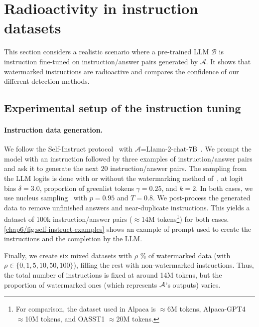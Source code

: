 \renewcommand{\aux}[1]{{\scriptsize \textcolor{gray}{$\pm$#1}}}

\section{Radioactivity in instruction datasets}
\label{chap6/sec:instruction}


This section considers a realistic scenario where a pre-trained LLM $\mathcal{B}$ is instruction fine-tuned on instruction/answer pairs generated by $\mathcal{A}$.
It shows that watermarked instructions are radioactive and compares the confidence of our different detection methods.




\subsection{Experimental setup of the instruction tuning}\label{chap6/sec:exp_setting}




\paragraph*{Instruction data generation.} 
We follow the Self-Instruct protocol~\citep{wang2022self} with $\mathcal{A}$=Llama-2-chat-7B~\citep{touvron2023llama2}.
We prompt the model with an instruction followed by three examples of instruction/answer pairs and ask it to generate the next $20$ instruction/answer pairs.
The sampling from the LLM logits is done with or without the watermarking method of~\citet{kirchenbauer2023watermark}, at logit bias $\delta=3.0$, proportion of greenlist tokens $\gamma=0.25$, and $k=2$. 
In both cases, we use nucleus sampling~\citep{holtzman2019curious} with $p=0.95$ and $T=0.8$.
We post-process the generated data to remove unfinished answers and near-duplicate instructions.
This yields a dataset of 100k instruction/answer pairs ($\approx$14M tokens\footnote{
    For comparison, the dataset used in Alpaca is $\approx$6M tokens, Alpaca-GPT4 $\approx$10M tokens, and OASST1 $\approx$20M tokens.
}) for both cases.
\autoref{chap6/fig:self-instruct-examples} shows an example of prompt used to create the instructions and the completion by the LLM.


Finally, we create six mixed datasets with $\rho$ \% of watermarked data (with $\rho \in \{ 0, 1, 5, 10, 50, 100\}$), filling the rest with non-watermarked instructions.
Thus, the total number of instructions is fixed at around 14M tokens, but the proportion of watermarked ones (which represents $\mathcal A$'s outputs) varies.



